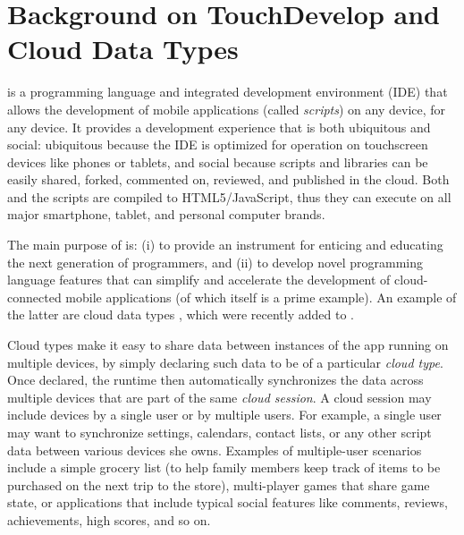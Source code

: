 \documentclass[article]{sigplanconf}
\begin{document}
\section{Background on TouchDevelop and Cloud Data Types}

\TD is a programming language and integrated development environment (IDE) that
allows the development of mobile applications (called \emph{scripts}) on any
device, for any device. 
It provides a development experience that is both ubiquitous and social:
ubiquitous because the IDE is optimized for operation on touchscreen devices
like phones or tablets, and social because scripts and libraries can be easily
shared, forked, commented on, reviewed, and published in the cloud.
Both \TD and the \TD scripts are compiled to HTML5/JavaScript, thus they can
execute on all major smartphone, tablet, and personal computer brands.  

The main purpose of \TD is: (i) to provide an instrument for enticing and educating the next generation of programmers, and (ii) to develop novel programming language features that can simplify and accelerate the development of cloud-connected mobile applications (of which \TD itself is a prime example). An example of the latter are cloud data types \cite{burckhardt2012cloud}, which were recently added to \TD. 

Cloud types make it easy to share data between instances of the app running on multiple devices, by simply declaring such data to be of a particular \emph{cloud type}. Once declared, the runtime then automatically synchronizes the data across multiple devices that are part of the same \emph{cloud session}. A cloud session may include devices by a single user or by multiple users.  For example, a single user may want to synchronize settings, calendars, contact lists, or any other script data between various devices she owns. Examples of multiple-user scenarios include a simple grocery list (to help family members keep track of items to be purchased on the next trip to the store), multi-player games that share game state, or applications that include typical social features like comments, reviews, achievements, high scores, and so on.
\end{document}
